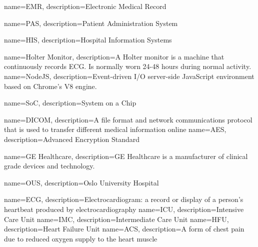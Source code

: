 {
    name=EMR,
    description={Electronic Medical Record}
}

{
    name=PAS,
    description={Patient Administration System}
}

{
    name=HIS,
    description={Hospital Information Systems}
}

{
    name=Holter Monitor,
    description={A Holter monitor is a machine that continuously records ECG. Is normally worn 24-48 hours during normal activity.}
}
{
    name=NodeJS,
    description={Event-driven I/O server-side JavaScript environment based on Chrome's V8 engine.}
}

{
    name=SoC,
    description={System on a Chip}
}

{
    name=DICOM,
    description={A file format and network communications protocol that is used to transfer different medical information online}
}
{
    name=AES,
    description={Advanced Encryption Standard}
}

{
    name=GE Healthcare,
    description={GE Healthcare is a manufacturer of clinical grade devices and technology.}
}

{
    name=OUS,
    description={Oslo University Hospital}
}

{
    name=ECG,
    description={Electrocardiogram: a record or display of a person's heartbeat produced by electrocardiography}
}
{
    name=ICU,
    description={Intensive Care Unit}
}
{
    name=IMC,
    description={Intermediate Care Unit}
}
{
    name=HFU,
    description={Heart Failure Unit}
}
{
    name=ACS,
    description={A form of chest pain due to reduced oxygen supply to the heart muscle}
}